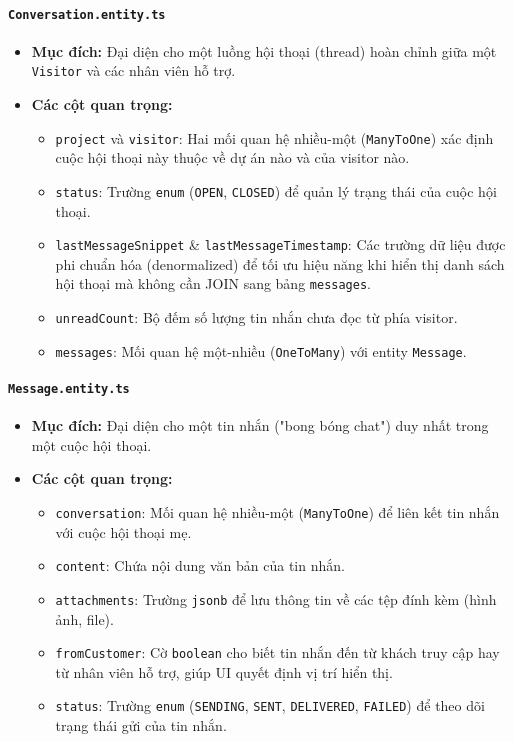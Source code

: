 \paragraph{\texttt{Conversation.entity.ts}}
\begin{itemize}
    \item \textbf{Mục đích:} Đại diện cho một luồng hội thoại (thread) hoàn chỉnh giữa một \texttt{Visitor} và các nhân viên hỗ trợ.
    \item \textbf{Các cột quan trọng:}
    \begin{itemize}
        \item \texttt{project} và \texttt{visitor}: Hai mối quan hệ nhiều-một (\texttt{ManyToOne}) xác định cuộc hội thoại này thuộc về dự án nào và của visitor nào.
        \item \texttt{status}: Trường \texttt{enum} (\texttt{OPEN}, \texttt{CLOSED}) để quản lý trạng thái của cuộc hội thoại.
        \item \texttt{lastMessageSnippet} \& \texttt{lastMessageTimestamp}: Các trường dữ liệu được phi chuẩn hóa (denormalized) để tối ưu hiệu năng khi hiển thị danh sách hội thoại mà không cần JOIN sang bảng \texttt{messages}.
        \item \texttt{unreadCount}: Bộ đếm số lượng tin nhắn chưa đọc từ phía visitor.
        \item \texttt{messages}: Mối quan hệ một-nhiều (\texttt{OneToMany}) với entity \texttt{Message}.
    \end{itemize}
\end{itemize}

\paragraph{\texttt{Message.entity.ts}}
\begin{itemize}
    \item \textbf{Mục đích:} Đại diện cho một tin nhắn ("bong bóng chat") duy nhất trong một cuộc hội thoại.
    \item \textbf{Các cột quan trọng:}
    \begin{itemize}
        \item \texttt{conversation}: Mối quan hệ nhiều-một (\texttt{ManyToOne}) để liên kết tin nhắn với cuộc hội thoại mẹ.
        \item \texttt{content}: Chứa nội dung văn bản của tin nhắn.
        \item \texttt{attachments}: Trường \texttt{jsonb} để lưu thông tin về các tệp đính kèm (hình ảnh, file).
        \item \texttt{fromCustomer}: Cờ \texttt{boolean} cho biết tin nhắn đến từ khách truy cập hay từ nhân viên hỗ trợ, giúp UI quyết định vị trí hiển thị.
        \item \texttt{status}: Trường \texttt{enum} (\texttt{SENDING}, \texttt{SENT}, \texttt{DELIVERED}, \texttt{FAILED}) để theo dõi trạng thái gửi của tin nhắn.
    \end{itemize}
\end{itemize}

